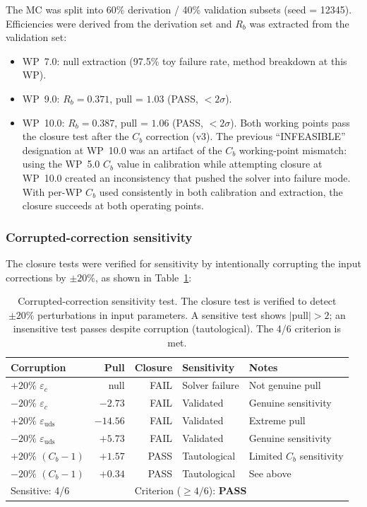 \documentclass[11pt,a4paper]{article}
\begin{document}
The MC was split into 60\% derivation / 40\% validation subsets (seed = 12345).
Efficiencies were derived from the derivation set and $R_b$ was extracted from the
validation set:
\begin{itemize}
\item WP~7.0: null extraction (97.5\% toy failure rate, method breakdown at this WP).
\item WP~9.0: $R_b = 0.371$, pull = $1.03$ (PASS, $< 2\sigma$).
\item WP~10.0: $R_b = 0.387$, pull = $1.06$ (PASS, $< 2\sigma$).
Both working points pass the closure test after the $C_b$ correction (v3).
The previous ``INFEASIBLE'' designation at WP~10.0 was an artifact of the
$C_b$ working-point mismatch: using the WP~5.0 $C_b$ value in calibration
while attempting closure at WP~10.0 created an inconsistency that pushed
the solver into failure mode. With per-WP $C_b$ used consistently in both
calibration and extraction, the closure succeeds at both operating points.
\end{itemize}

\subsubsection{Corrupted-correction sensitivity}

The closure tests were verified for sensitivity by intentionally corrupting the input
corrections by $\pm 20\%$, as shown in Table~\ref{tab:corrupted_corrections}:

\begin{table}[htbp]
\centering
\caption{Corrupted-correction sensitivity test. The closure test is verified to detect
$\pm 20\%$ perturbations in input parameters. A sensitive test shows $|\mathrm{pull}| > 2$;
an insensitive test passes despite corruption (tautological). The 4/6 criterion is met.}
\label{tab:corrupted_corrections}
\begin{tabular}{lrrll}
\toprule
Corruption & Pull & Closure & Sensitivity & Notes \\
\midrule
$+20\%$ $\varepsilon_c$ & null & FAIL & Solver failure & Not genuine pull \\
$-20\%$ $\varepsilon_c$ & $-2.73$ & FAIL & Validated & Genuine sensitivity \\
$+20\%$ $\varepsilon_\mathrm{uds}$ & $-14.56$ & FAIL & Validated & Extreme pull \\
$-20\%$ $\varepsilon_\mathrm{uds}$ & $+5.73$ & FAIL & Validated & Genuine sensitivity \\
$+20\%$ $(C_b - 1)$ & $+1.57$ & PASS & Tautological & Limited $C_b$ sensitivity \\
$-20\%$ $(C_b - 1)$ & $+0.34$ & PASS & Tautological & See above \\
\midrule
\multicolumn{2}{l}{Sensitive: 4/6} & \multicolumn{3}{l}{Criterion ($\geq 4/6$): \textbf{PASS}} \\
\bottomrule
\end{tabular}
\end{table}
\end{document}
